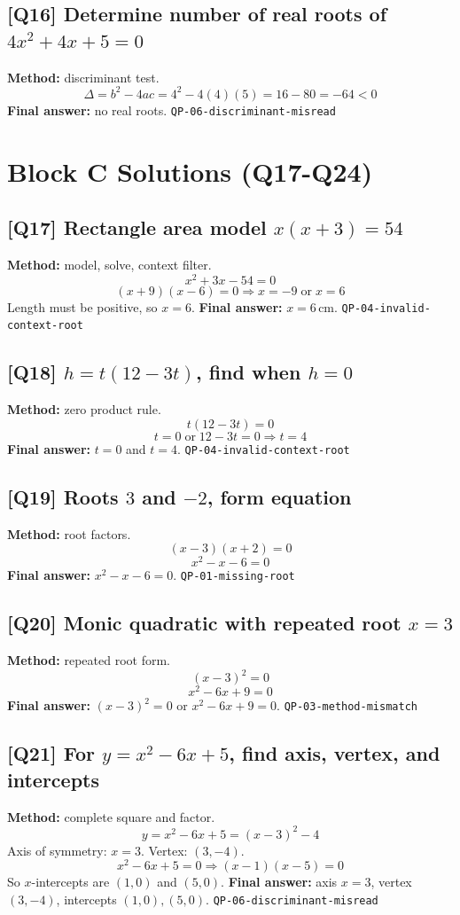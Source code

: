 \documentclass[11pt,a4paper]{article}
\newcommand{\QID}[1]{\textcolor{MPrimary}{\textbf{[#1]}}}
\newcommand{\Tag}[1]{\textcolor{MMuted}{\texttt{#1}}}
\begin{document}
\subsection*{\QID{Q16} Determine number of real roots of \(4x^2+4x+5=0\)}
\textbf{Method:} discriminant test.
\[
\Delta=b^2-4ac=4^2-4(4)(5)=16-80=-64<0
\]
\textbf{Final answer:} no real roots. \Tag{QP-06-discriminant-misread}

\section{Block C Solutions (Q17-Q24)}

\subsection*{\QID{Q17} Rectangle area model \(x(x+3)=54\)}
\textbf{Method:} model, solve, context filter.
\[
x^2+3x-54=0
\]
\[
(x+9)(x-6)=0 \Rightarrow x=-9\;\text{or}\;x=6
\]
Length must be positive, so \(x=6\).
\textbf{Final answer:} \(x=6\,\text{cm}\). \Tag{QP-04-invalid-context-root}

\subsection*{\QID{Q18} \(h=t(12-3t)\), find when \(h=0\)}
\textbf{Method:} zero product rule.
\[
t(12-3t)=0
\]
\[
t=0\;\text{or}\;12-3t=0\Rightarrow t=4
\]
\textbf{Final answer:} \(t=0\) and \(t=4\). \Tag{QP-04-invalid-context-root}

\subsection*{\QID{Q19} Roots \(3\) and \(-2\), form equation}
\textbf{Method:} root factors.
\[
(x-3)(x+2)=0
\]
\[
x^2-x-6=0
\]
\textbf{Final answer:} \(x^2-x-6=0\). \Tag{QP-01-missing-root}

\subsection*{\QID{Q20} Monic quadratic with repeated root \(x=3\)}
\textbf{Method:} repeated root form.
\[
(x-3)^2=0
\]
\[
x^2-6x+9=0
\]
\textbf{Final answer:} \((x-3)^2=0\) or \(x^2-6x+9=0\). \Tag{QP-03-method-mismatch}

\subsection*{\QID{Q21} For \(y=x^2-6x+5\), find axis, vertex, and intercepts}
\textbf{Method:} complete square and factor.
\[
y=x^2-6x+5=(x-3)^2-4
\]
Axis of symmetry: \(x=3\). Vertex: \((3,-4)\).
\[
x^2-6x+5=0 \Rightarrow (x-1)(x-5)=0
\]
So \(x\)-intercepts are \((1,0)\) and \((5,0)\).
\textbf{Final answer:} axis \(x=3\), vertex \((3,-4)\), intercepts \((1,0),(5,0)\). \Tag{QP-06-discriminant-misread}
\end{document}
